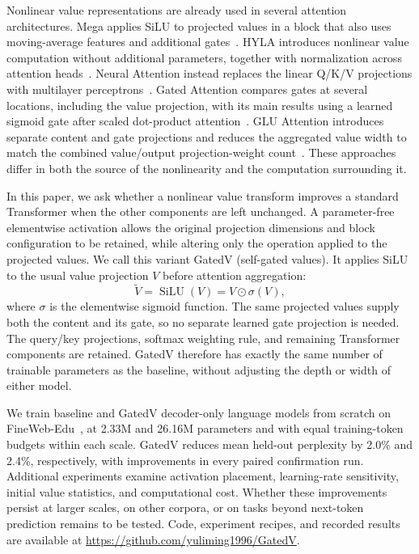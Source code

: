 \documentclass[11pt,a4paper]{article}
\newcommand{\silu}{\operatorname{SiLU}}
\begin{document}
Nonlinear value representations are already used in several attention architectures. Mega applies SiLU to projected values in a block that also uses moving-average features and additional gates~\citep{mega}. HYLA introduces nonlinear value computation without additional parameters, together with normalization across attention heads~\citep{hypernetwork}. Neural Attention instead replaces the linear Q/K/V projections with multilayer perceptrons~\citep{neuralattention}. Gated Attention compares gates at several locations, including the value projection, with its main results using a learned sigmoid gate after scaled dot-product attention~\citep{gatedattention}. GLU Attention introduces separate content and gate projections and reduces the aggregated value width to match the combined value/output projection-weight count~\citep{gluattention}. These approaches differ in both the source of the nonlinearity and the computation surrounding it.

In this paper, we ask whether a nonlinear value transform improves a standard Transformer when the other components are left unchanged. A parameter-free elementwise activation allows the original projection dimensions and block configuration to be retained, while altering only the operation applied to the projected values.
We call this variant GatedV (self-gated values). It applies SiLU to the usual value projection $V$ before attention aggregation:
\[
    \widetilde V=\silu(V)=V\odot\sigma(V),
\]
where $\sigma$ is the elementwise sigmoid function. The same projected values supply both the content and its gate, so no separate learned gate projection is needed. The query/key projections, softmax weighting rule, and remaining Transformer components are retained. GatedV therefore has exactly the same number of trainable parameters as the baseline, without adjusting the depth or width of either model.

We train baseline and GatedV decoder-only language models from scratch on FineWeb-Edu~\citep{fineweb}, at 2.33M and 26.16M parameters and with equal training-token budgets within each scale. GatedV reduces mean held-out perplexity by 2.0\% and 2.4\%, respectively, with improvements in every paired confirmation run. Additional experiments examine activation placement, learning-rate sensitivity, initial value statistics, and computational cost. Whether these improvements persist at larger scales, on other corpora, or on tasks beyond next-token prediction remains to be tested.
Code, experiment recipes, and recorded results are available at \url{https://github.com/yuliming1996/GatedV}.
\end{document}

